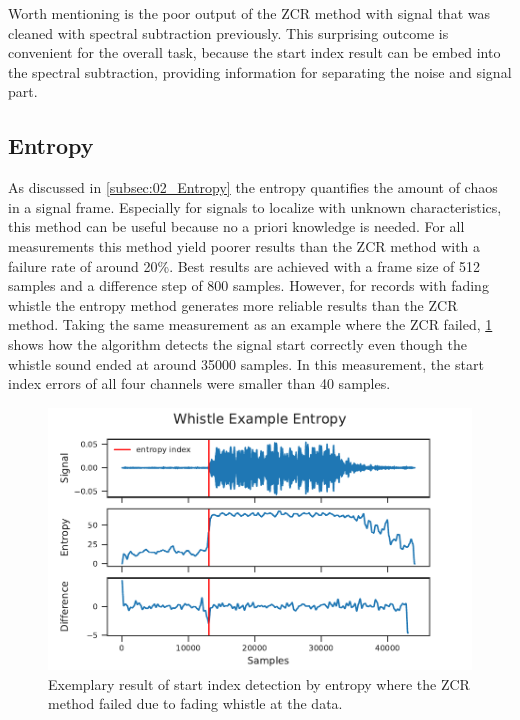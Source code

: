 Worth mentioning is the poor output of the \ac{ZCR} method with
signal that was cleaned with spectral subtraction previously.
This surprising outcome is convenient for the overall task,
because the start index result can be embed into the spectral
subtraction, providing information for separating the noise
and signal part.

\subsection{Entropy}
\label{subsec:04_entropy}

As discussed in \cref{subsec:02_Entropy} the entropy quantifies the amount
of chaos in a signal frame.
Especially for signals to localize with unknown characteristics,
this method can be useful because no a priori knowledge is needed.
For all measurements this method yield poorer results than the \ac{ZCR} method
with a failure rate of around 20\si{\percent}.
Best results are achieved with a frame size of 512 samples and a difference
step of 800 samples.
However, for records with fading whistle the entropy method
generates more reliable results than the \ac{ZCR} method.
Taking the same measurement as an example where the \ac{ZCR} failed,
\cref{fig:04_entropyGood} shows how the algorithm detects the
signal start correctly even though
the whistle sound ended at around 35000 samples.
In this measurement, the start index errors of all four channels
were smaller than 40 samples.
\begin{figure}[ht]
	\centering
	\includegraphics[]{figures/evaluation/entropy_good}
	\caption{Exemplary result of start index detection by entropy where
			the \ac{ZCR} method failed due to fading whistle
			at the data.}
	\label{fig:04_entropyGood}
\end{figure}

